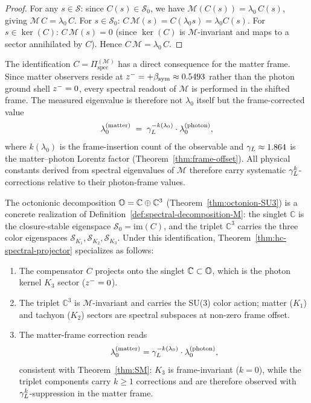\begin{proof}
For any $s\in\mathcal{S}$: since $C(s)\in\mathcal{S}_0$, we have
$\mathcal{M}(C(s))=\lambda_0\,C(s)$, giving $\mathcal{M}\,C=\lambda_0\,C$.
For $s\in\mathcal{S}_0$: $C\,\mathcal{M}(s)=C(\lambda_0 s)=\lambda_0 C(s)$.
For $s\in\ker(C)$: $C\,\mathcal{M}(s)=0$ (since $\ker(C)$ is
$\mathcal{M}$-invariant and maps to a sector annihilated by $C$).
Hence $C\,\mathcal{M}=\lambda_0\,C$.
\end{proof}

\begin{remark}
\label{rem:frame-shift-spectral}
The identification $C = \Pi^{(\mathcal{M})}_{\mathrm{spec}}$ has a direct
consequence for the matter frame. Since matter observers reside at
$z^- = +\beta_{\mathrm{sym}} \approx 0.5493$ rather than the photon ground shell
$z^- = 0$, every spectral readout of $\mathcal{M}$ is performed in the
shifted frame. The measured eigenvalue is therefore not $\lambda_0$ itself
but the frame-corrected value
\[
  \lambda_0^{(\mathrm{matter})}
  \;=\; \gamma_L^{-k(\lambda_0)}\cdot\lambda_0^{(\mathrm{photon})},
\]
where $k(\lambda_0)$ is the frame-insertion count of the observable and
$\gamma_L \approx 1.864$ is the matter--photon Lorentz factor
(Theorem~\ref{thm:frame-offset}). All physical constants derived from
spectral eigenvalues of $\mathcal{M}$ therefore carry systematic
$\gamma_L^k$-corrections relative to their photon-frame values.
\end{remark}

\begin{corollary}
\label{cor:SM-spectral-realization}
The octonionic decomposition $\mathbb{O} = \mathbb{C}\oplus\mathbb{C}^3$
(Theorem~\ref{thm:octonion-SU3}) is a concrete realization of
Definition~\ref{def:spectral-decomposition-M}: the singlet $\mathbb{C}$ is
the closure-stable eigenspace $\mathcal{S}_0 = \mathrm{im}(C)$, and the
triplet $\mathbb{C}^3$ carries the three color eigenspaces
$\mathcal{S}_{K_1},\mathcal{S}_{K_2},\mathcal{S}_{K_3}$.
Under this identification, Theorem~\ref{thm:hc-spectral-projector}
specializes as follows:
\begin{enumerate}[label=(\roman*)]
  \item The compensator $C$ projects onto the singlet $\mathbb{C}\subset\mathbb{O}$,
  which is the photon kernel $K_3$ sector ($z^-=0$).
  \item The triplet $\mathbb{C}^3$ is $\mathcal{M}$-invariant and carries
  the SU(3) color action; matter ($K_1$) and tachyon ($K_2$) sectors are
  spectral subspaces at non-zero frame offset.
  \item The matter-frame correction reads
  \[
    \lambda_0^{(\mathrm{matter})}
    = \gamma_L^{-k(\lambda_0)}\cdot\lambda_0^{(\mathrm{photon})},
  \]
  consistent with Theorem~\ref{thm:SM}: $K_3$ is frame-invariant
  ($k=0$), while the triplet components carry $k\ge 1$ corrections
  and are therefore observed with $\gamma_L^k$-suppression in the matter frame.
\end{enumerate}
\end{corollary}

